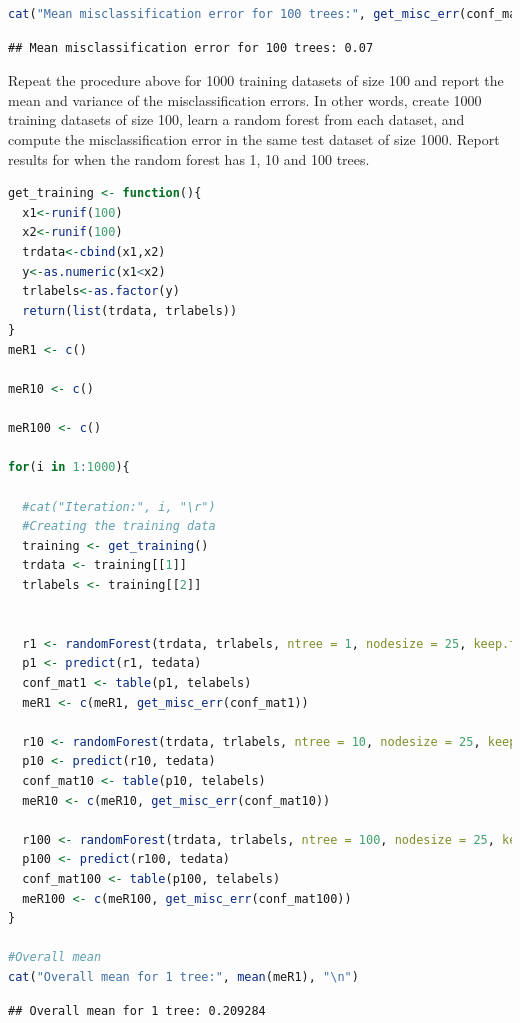 \documentclass[
]{article}
\begin{document}
\begin{lstlisting}[language=R]
cat("Mean misclassification error for 100 trees:", get_misc_err(conf_mat100), "\n")
\end{lstlisting}

\begin{lstlisting}
## Mean misclassification error for 100 trees: 0.07
\end{lstlisting}

Repeat the procedure above for 1000 training datasets of size 100 and
report the mean and variance of the misclassification errors. In other
words, create 1000 training datasets of size 100, learn a random forest
from each dataset, and compute the misclassification error in the same
test dataset of size 1000. Report results for when the random forest has
1, 10 and 100 trees.

\begin{lstlisting}[language=R]
get_training <- function(){
  x1<-runif(100)
  x2<-runif(100)
  trdata<-cbind(x1,x2)
  y<-as.numeric(x1<x2)
  trlabels<-as.factor(y)
  return(list(trdata, trlabels))
}
meR1 <- c()

meR10 <- c()

meR100 <- c()

for(i in 1:1000){
  
  #cat("Iteration:", i, "\r")
  #Creating the training data
  training <- get_training()
  trdata <- training[[1]]
  trlabels <- training[[2]]
  
  
  r1 <- randomForest(trdata, trlabels, ntree = 1, nodesize = 25, keep.forest = TRUE)
  p1 <- predict(r1, tedata)
  conf_mat1 <- table(p1, telabels)
  meR1 <- c(meR1, get_misc_err(conf_mat1))
  
  r10 <- randomForest(trdata, trlabels, ntree = 10, nodesize = 25, keep.forest = TRUE)
  p10 <- predict(r10, tedata)
  conf_mat10 <- table(p10, telabels)
  meR10 <- c(meR10, get_misc_err(conf_mat10))
  
  r100 <- randomForest(trdata, trlabels, ntree = 100, nodesize = 25, keep.forest = TRUE)
  p100 <- predict(r100, tedata)
  conf_mat100 <- table(p100, telabels)
  meR100 <- c(meR100, get_misc_err(conf_mat100))
}

#Overall mean
cat("Overall mean for 1 tree:", mean(meR1), "\n")
\end{lstlisting}

\begin{lstlisting}
## Overall mean for 1 tree: 0.209284
\end{lstlisting}
\end{document}
